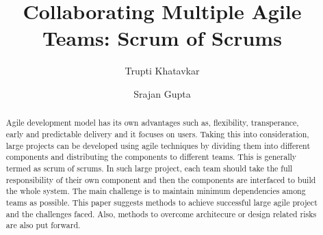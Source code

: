 \documentclass[sigconf]{acmart}
\begin{document}
%
\title{Collaborating Multiple Agile Teams: Scrum of Scrums}

%

\author{Trupti Khatavkar}

\author{Srajan Gupta}

%
\begin{abstract}
Agile development model has its own advantages such as, flexibility, transperance, early and predictable delivery and it focuses on users. Taking this into consideration, large projects can be developed using agile techniques by dividing them into different components and distributing the components to different teams. This is generally termed as scrum of scrums. In such large project, each team should take the full responsibility of their own component and then the components are interfaced to build the whole system. The main challenge is to maintain minimum dependencies among teams as possible. This paper suggests methods to achieve successful large agile project and the challenges faced. Also, methods to overcome architecure or design related risks are also put forward.
\end{abstract}


%

%


%
\maketitle
\end{document}
